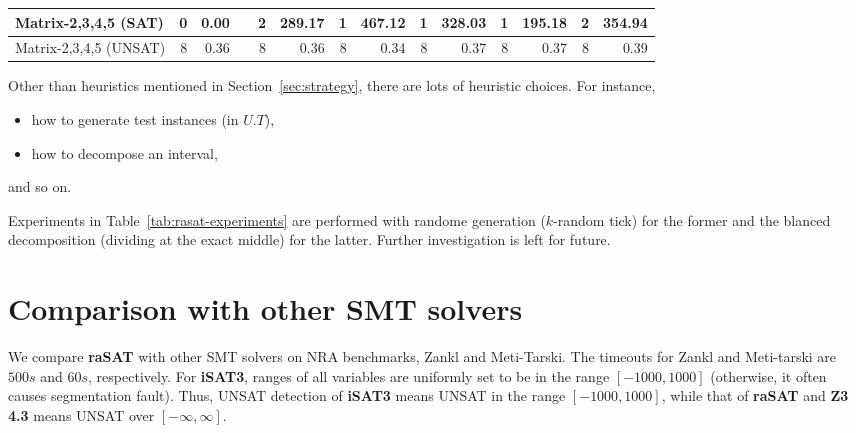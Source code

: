 \begin{table*}[t]
{\begin{tabular}{ | l | r | r  r | r | r  | r | r | r | r | r | r |r | r |}
\\
\hline
 Matrix-2,3,4,5 (SAT) & 0 & 0.00 && 2 & 289.17 & 1 & 467.12 & 1 & 328.03 & 1 & 195.18 & 2 & 354.94 
\\
\hline
 Matrix-2,3,4,5 (UNSAT) & 8 & 0.36 && 8 & 0.36 & 8 & 0.34 & 8 & 0.37 & 8 & 0.37 & 8 & 0.39 
\\
\hline
\end{tabular}
}
\bigskip
{}
\medskip
\caption{Combnations of {\bf raSAT} strategies on NRA/Zankl,Meti-Tarski benchmark} 
\label{tab:rasat-experiments}
\end{table*}

Other than heuristics mentioned in Section~\ref{sec:strategy}, 
there are lots of heuristic choices. 
For instance, 
\begin{itemize}
\item how to generate test instances (in $U.T$), 
\item how to decompose an interval, 
\end{itemize} 
and so on. 

Experiments in Table~\ref{tab:rasat-experiments} are performed 
with randome generation ($k$-random tick) for the former and the blanced decomposition 
(dividing at the exact middle) for the latter. 
Further investigation is left for future. 


\section{Comparison with other SMT solvers}

We compare {\bf raSAT} with other SMT solvers on NRA benchmarks, Zankl and Meti-Tarski. 
The timeouts for Zankl and Meti-tarski are $500s$ and $60s$, respectively. 
For {\bf iSAT3}, ranges of all variables are uniformly set to be in the range $[-1000, 1000]$
(otherwise, it often causes segmentation fault). 
Thus, UNSAT detection of {\bf iSAT3} means UNSAT in the range $[-1000, 1000]$, 
while that of {\bf raSAT} and {\bf Z3 4.3} means  UNSAT over $[-\infty, \infty]$. 

